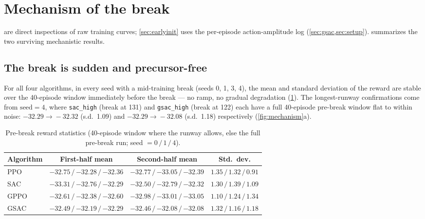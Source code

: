 \section{Mechanism of the break}
\label{sec:mechanism}

 are direct inspections of raw training
curves; \cref{sec:earlyinit} uses the per-episode action-amplitude log
(\cref{sec:gsac,sec:setup}).  summarizes the two
surviving mechanistic results.

\subsection{The break is sudden and precursor-free}
\label{sec:precursor}

For all four algorithms, in every seed with a mid-training break (seeds 0, 1,
3, 4), the mean and standard deviation of the reward are stable over the
40-episode window immediately before the break --- no ramp, no gradual
degradation (\cref{tab:prebreak}). The longest-runway confirmations come from
$\text{seed}=4$, where \texttt{sac\_high} (break at 131) and
\texttt{gsac\_high} (break at 122) each have a full 40-episode pre-break
window flat to within noise: $-32.29\!\to\!-32.32$ (s.d.\ 1.09) and
$-32.29\!\to\!-32.08$ (s.d.\ 1.18) respectively (\cref{fig:mechanism}a).

\begin{table}[t]
\centering
\caption{Pre-break reward statistics (40-episode window where the runway
allows, else the full pre-break run; seed $=0\,/\,1\,/\,4$).}
\label{tab:prebreak}
\small
\begin{tabular}{|l|c|c|c|}
\hline
Algorithm & First-half mean & Second-half mean & Std.\ dev. \\
\hline
PPO  & $-32.75\,/\,{-32.28}\,/\,{-32.36}$ & $-32.77\,/\,{-33.05}\,/\,{-32.39}$ & $1.35\,/\,1.32\,/\,0.91$ \\
\hline
SAC  & $-33.31\,/\,{-32.76}\,/\,{-32.29}$ & $-32.50\,/\,{-32.79}\,/\,{-32.32}$ & $1.30\,/\,1.39\,/\,1.09$ \\
\hline
GPPO & $-32.61\,/\,{-32.38}\,/\,{-32.60}$ & $-32.98\,/\,{-33.01}\,/\,{-33.05}$ & $1.10\,/\,1.24\,/\,1.34$ \\
\hline
GSAC & $-32.49\,/\,{-32.19}\,/\,{-32.29}$ & $-32.46\,/\,{-32.08}\,/\,{-32.08}$ & $1.32\,/\,1.16\,/\,1.18$ \\
\hline
\end{tabular}
\end{table}

